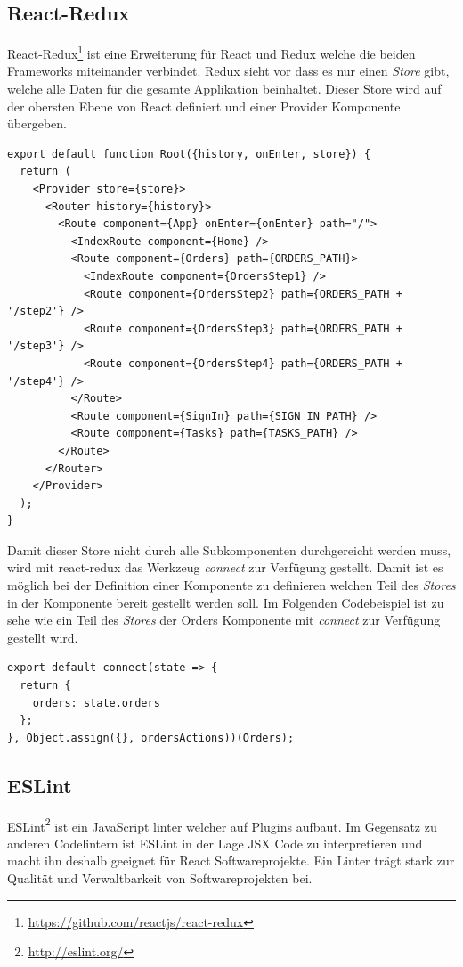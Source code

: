 \subsection{React-Redux}
React-Redux\footnote{\url{https://github.com/reactjs/react-redux}} ist eine Erweiterung für React und Redux welche die beiden Frameworks miteinander verbindet. Redux sieht vor dass es nur einen \textit{Store} gibt, welche alle Daten für die gesamte Applikation beinhaltet. Dieser Store wird auf der obersten Ebene von React definiert und einer Provider Komponente übergeben.

\begin{lstlisting}[caption=Root Komponente]
export default function Root({history, onEnter, store}) {
  return (
    <Provider store={store}>
      <Router history={history}>
        <Route component={App} onEnter={onEnter} path="/">
          <IndexRoute component={Home} />
          <Route component={Orders} path={ORDERS_PATH}>
            <IndexRoute component={OrdersStep1} />
            <Route component={OrdersStep2} path={ORDERS_PATH + '/step2'} />
            <Route component={OrdersStep3} path={ORDERS_PATH + '/step3'} />
            <Route component={OrdersStep4} path={ORDERS_PATH + '/step4'} />
          </Route>
          <Route component={SignIn} path={SIGN_IN_PATH} />
          <Route component={Tasks} path={TASKS_PATH} />
        </Route>
      </Router>
    </Provider>
  );
}
\end{lstlisting}

Damit dieser Store nicht durch alle Subkomponenten durchgereicht werden muss, wird mit react-redux das Werkzeug \textit{connect} zur Verfügung gestellt. Damit ist es möglich bei der Definition einer Komponente zu definieren welchen Teil des \textit{Stores} in der Komponente bereit gestellt werden soll. Im Folgenden Codebeispiel ist zu sehe wie ein Teil des \textit{Stores} der Orders Komponente mit \textit{connect} zur Verfügung gestellt wird.
\begin{lstlisting}[caption=connect im Einsatz]
export default connect(state => {
  return {
    orders: state.orders
  };
}, Object.assign({}, ordersActions))(Orders);
\end{lstlisting}

\subsection{ESLint}
ESLint\footnote{\url{http://eslint.org/}} ist ein JavaScript linter welcher auf Plugins aufbaut. Im Gegensatz zu anderen Codelintern ist ESLint in der Lage JSX Code zu interpretieren und macht ihn deshalb geeignet für React Softwareprojekte. Ein Linter trägt stark zur Qualität und Verwaltbarkeit von Softwareprojekten bei.

